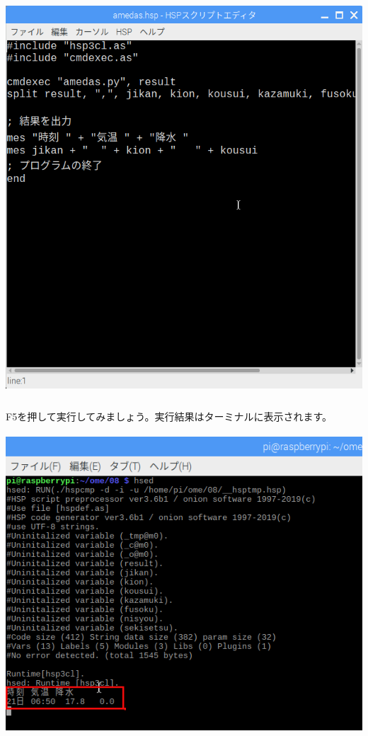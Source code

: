 \documentclass[a4paper,12pt,dvipdfmx]{jarticle}
\begin{document}
\begin{center}
\includegraphics[width=13.887cm,height=14.903cm]{textbook-img030.png}

\end{center}

\bigskip


\bigskip

\clearpage
F5を押して実行してみましょう。実行結果はターミナルに表示されます。



\begin{center}
\includegraphics[width=16.722cm,height=11.229cm]{textbook-img031.png}

\end{center}
\end{document}
